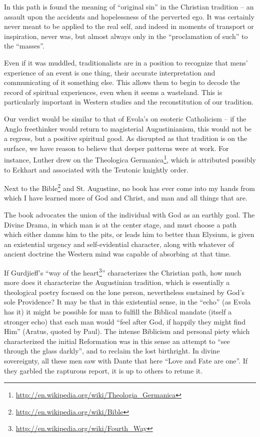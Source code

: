In this path is found the meaning of ``original sin'' in the Christian tradition -- an assault upon the accidents and hopelessness of the perverted ego. It was certainly never meant to be applied to the real self, and indeed in moments of transport or inspiration, never was, but almost always only in the ``proclamation of such'' to the ``masses''.

Even if it was muddled, traditionalists are in a position to recognize that mens' experience of an event is one thing, their accurate interpretation and communicating of it something else. This allows them to begin to decode the record of spiritual experiences, even when it seems a wasteland. This is particularly important in Western studies and the reconstitution of our tradition.

Our verdict would be similar to that of Evola's on esoteric Catholicism -- if the Anglo freethinker would return to magisterial Augustinianism, this would not be a regress, but a positive spiritual good. As disrupted as that tradition is on the surface, we have reason to believe that deeper patterns were at work. For instance, Luther drew on the Theologica Germanica\footnote{\url{http://en.wikipedia.org/wiki/Theologia_Germanica}}, which is attributed possibly to Eckhart and associated with the Teutonic knightly order.

\begin{quotex}
Next to the Bible\footnote{\url{http://en.wikipedia.org/wiki/Bible}} and St. Augustine, no book has ever come into my hands from which I have learned more of God and Christ, and man and all things that are.
\end{quotex}


The book advocates the union of the individual with God as an earthly goal. The Divine Drama, in which man is at the center stage, and must choose a path which either damns him to the pits, or leads him to better than Elysium, is given an existential urgency and self-evidential character, along with whatever of ancient doctrine the Western mind was capable of absorbing at that time.

If Gurdjieff's ``way of the heart\footnote{\url{http://en.wikipedia.org/wiki/Fourth_Way}}'' characterizes the Christian path, how much more does it characterize the Augustinian tradition, which is essentially a theological poetry focused on the lone person, nevertheless sustained by God's sole Providence? It may be that in this existential sense, in the ``echo'' (as Evola has it) it might be possible for man to fulfill the Biblical mandate (itself a stronger echo) that each man would ``feel after God, if happily they might find Him'' (Aratus, quoted by Paul). The intense Biblicism and personal piety which characterized the initial Reformation was in this sense an attempt to ``see through the glass darkly'', and to reclaim the lost birthright. In divine sovereignty, all these men saw with Dante that here ``Love and Fate are one''. If they garbled the rapturous report, it is up to others to retune it.

